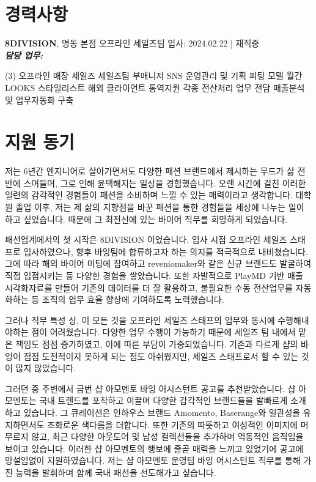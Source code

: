 \documentclass[a4paper,10pt]{extarticle}
\begin{document}
\section*{경력사항}
\noindent
{\large\textbf{8DIVISION}}, 명동 본점 오프라인 세일즈팀 \hfill 입사: 2024.02.22 | 재직중\\
{\textbf{\textit{담당 업무:}}}
\begin{tasks}[style=itemize](3)
	\task 오프라인 매장 세일즈
	\task 세일즈팀 부매니저
	\task SNS 운영관리 및 기획
	\task 피팅 모델
	\task 월간 LOOKS 스타일리스트
	\task 해외 클라이언트 통역지원
	\task 각종 전산처리 업무 전담
	\task 매출분석 및 업무자동화 구축
\end{tasks}

\section*{지원 동기}
저는 6년간 엔지니어로 살아가면서도 다양한 패션 브랜드에서 제시하는 무드가 삶 전반에 스며들며, 그로 인해 윤택해지는 일상을 경험했습니다. 오랜 시간에 걸친 이러한 일련의 감각적인 경험들이 패션을 소비하며 느낄 수 있는 매력이라고 생각합니다. 대학원 졸업 이후, 저는 제 삶의 지향점을 바꾼 패션을 통한 경험들을 세상에 나누는 일이 하고 싶었습니다. 때문에 그 최전선에 있는 바이어 직무를 희망하게 되었습니다.

패션업계에서의 첫 시작은 8DIVISION 이었습니다. 입사 시점 오프라인 세일즈 스태프로 입사하였으나, 향후 바잉팀에 합류하고자 하는 의지를 적극적으로 내비쳤습니다. 그에 따라 해외 바이어 미팅에 참여하고 reveniomaker와 같은 신규 브랜드도 발굴하여 직접 입점시키는 등 다양한 경험을 쌓았습니다. 또한 자발적으로 PlayMD 기반 매출 시각화자료를 만들어 기존의 데이터를 더 잘 활용하고, 불필요한 수동 전산업무를 자동화하는 등 조직의 업무 효율 향상에 기여하도록 노력했습니다.

그러나 직무 특성 상, 이 모든 것을 오프라인 세일즈 스태프의 업무와 동시에 수행해내야하는 점이 어려웠습니다. 다양한 업무 수행이 가능하기 때문에 세일즈 팀 내에서 맡은 책임도 점점 증가하였고, 이에 따른 부담이 가중되었습니다. 기존과 다르게 샵의 바잉이 점점 도전적이지 못하게 되는 점도 아쉬웠지만, 세일즈 스태프로서 할 수 있는 것이 많지 않았습니다.

그러던 중 주변에서 금번 샵 아모멘토 바잉 어시스턴트 공고를 추천받았습니다. 샵 아모멘토는 국내 트렌드를 포착하고 이끌며 다양한 감각적인 브랜드들을 발빠르게 소개하고 있습니다. 그 큐레이션은 인하우스 브랜드 Amomento, Baserange와 일관성을 유지하면서도 조화로운 색다름을 더합니다. 또한 기존의 따뜻하고 여성적인 이미지에 머무르지 않고, 최근 다양한 아웃도어 및 남성 컬렉션들을 추가하며 역동적인 움직임을 보이고 있습니다. 이러한 샵 아모멘토의 행보에 줄곧 매력을 느끼고 있었기에 공고에 망설임없이 지원하였습니다. 저는 샵 아모멘토 운영팀 바잉 어시스턴트 직무를 통해 가진 능력을 발휘하며 함께 국내 패션을 선도해가고 싶습니다.
\end{document}
